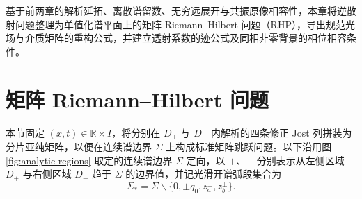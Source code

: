 
基于前两章的解析延拓、离散谱留数、无穷远展开与共振原像相容性，本章将逆散射问题整理为单值化谱平面上的矩阵 Riemann--Hilbert 问题（RHP），导出规范光场与介质矩阵的重构公式，并建立透射系数的迹公式及同相非零背景的相位相容条件。

\section{矩阵 Riemann--Hilbert 问题}

本节固定 $(x,t)\in\mathbb R\times I$，将分别在 $D_+$ 与 $D_-$ 内解析的四条修正 Jost 列拼装为分片亚纯矩阵，以便在连续谱边界 $\Sigma$ 上构成标准矩阵跳跃问题。以下沿用图 \ref{fig:analytic-regions} 取定的连续谱边界 $\Sigma$ 定向，以 $+$、$-$ 分别表示从左侧区域 $D_+$ 与右侧区域 $D_-$ 趋于 $\Sigma$ 的边界值，并记光滑开谱弧段集合为
\begin{equation*}
\Sigma_*=\Sigma\mathbin{\backslash}\{0,\pm q_0,z_a^\pm,z_b^\pm\}.
\end{equation*}

